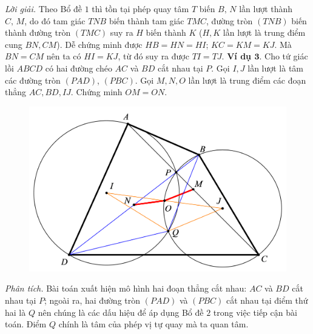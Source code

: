 \begin{multicols}{2}
\begin{figure}[H]
		\vspace*{-10pt}
	\end{figure}
	\textit{Lời giải.} Theo Bổ đề $1$ thì tồn tại phép quay tâm $T$ biến $B,\,N$ lần lượt thành $C,\,M$, do đó tam giác $TNB$ biến thành tam giác $TMC$, đường tròn $(TNB)$ biến thành đường tròn $(TMC)$ suy ra $H$ biến thành $K$ ($H, K$ lần lượt là trung điểm cung $BN,CM$). Dễ chứng minh được $HB=HN=HI$; $KC=KM=KJ$. Mà $BN=CM$ nên ta có $HI=KJ$, từ đó suy ra được $TI=TJ$.
	\vskip 0.1cm
	\textbf{\color{hoccungpi}Ví dụ $\pmb{3.}$} Cho tứ giác lồi $ABCD$ có hai đường chéo $AC$ và $BD$ cắt nhau tại $P$. Gọi $I,J$ lần lượt là tâm các đường tròn $(PAD)$, $(PBC)$. Gọi $M,N,O$ lần lượt là trung điểm các đoạn thẳng $AC,BD,IJ$. Chứng minh $OM=ON$.
	\begin{figure}[H]
		\vspace*{-5pt}
		\centering
		\captionsetup{labelformat= empty, justification=centering}
		\includegraphics[width= 1\linewidth]{6}
		\vspace*{-15pt}
	\end{figure}
	\textit{Phân tích.} Bài toán xuất hiện mô hình hai đoạn thẳng cắt nhau: $AC$ và $BD$ cắt nhau tại $P$; ngoài ra, hai đường tròn $(PAD)$ và $(PBC)$ cắt nhau tại điểm thứ hai là $Q$ nên chúng là các dấu hiệu để áp dụng Bổ đề $2$ trong việc tiếp cận bài toán. Điểm $Q$ chính là tâm của phép vị tự quay mà ta quan tâm.
	\begin{figure}[H]
		\vspace*{-10pt}
		\centering
		\captionsetup{labelformat= empty, justification=centering}

\end{figure}
\end{multicols}
